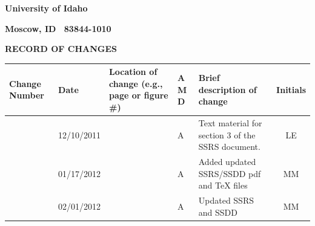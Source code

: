 \documentclass[twoside,letterpaper]{article}
\begin{document}
{\centering{}\bfseries\color{black}
University of Idaho
\par}

{\centering{}\bfseries\color{black}
Moscow, ID \ 83844-1010
\par}



\bigskip





{\centering\bfseries RECORD OF CHANGES \par}


\bigskip

\begin{flushleft}
\tablehead{}
\begin{supertabular}[c]{|m{0.75in}|m{1.0in}|m{1.5in}|m{0.25in}|m{2in}|c|}
\hline

\centering \bfseries Change
\centering \bfseries Number
&

\centering \bfseries Date
\par
&

\centering \bfseries Location of change\newline
\centering \bfseries(e.g., page or figure \#)
&

\centering \bfseries A\newline
\centering \bfseries M\newline
\centering \bfseries D  
&

\centering \bfseries Brief description\newline
\centering \bfseries of change
&
\bfseries Initials
\\\hline

& 12/10/2011
& ~
& \centering A
& Text material for section 3 of the SSRS document.
& LE

\\\hline
{}
& 01/17/2012
& ~
& \centering A
& Added updated SSRS/SSDD pdf and TeX files
& MM

\\\hline
{}
& 02/01/2012
& ~
& \centering A
& Updated SSRS and SSDD
& MM

\\\hline
\end{supertabular}
\end{flushleft}
\end{document}
